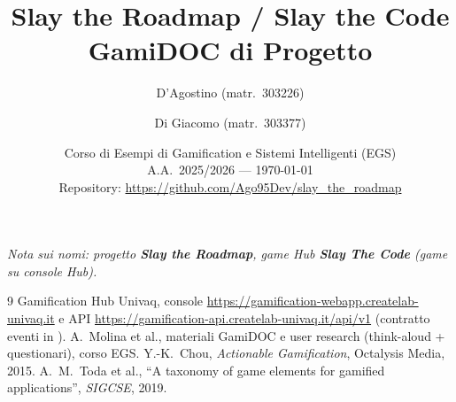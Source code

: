 \documentclass[a4paper,11pt]{report}
\title{Slay the Roadmap / Slay the Code\\GamiDOC di Progetto}
\author{D'Agostino (matr.\ 303226) \and Di Giacomo (matr.\ 303377)}
\date{Corso di Esempi di Gamification e Sistemi Intelligenti (EGS)\\A.A.\ 2025/2026 --- \today\\[1ex]
\small Repository: \url{https://github.com/Ago95Dev/slay_the_roadmap}}
\begin{document}
\maketitle
\begin{center}\small\textit{Nota sui nomi: progetto \textbf{Slay the Roadmap}, game Hub \textbf{Slay The Code} (game su console Hub).}\end{center}
\tableofcontents









\begin{thebibliography}{9}
 Gamification Hub Univaq, console \url{https://gamification-webapp.createlab-univaq.it} e API \url{https://gamification-api.createlab-univaq.it/api/v1} (contratto eventi in ).
 A.\ Molina et al., materiali GamiDOC e user research (think-aloud + questionari), corso EGS.
 Y.-K.\ Chou, \textit{Actionable Gamification}, Octalysis Media, 2015.
 A.\ M.\ Toda et al., ``A taxonomy of game elements for gamified applications'', \textit{SIGCSE}, 2019.
\end{thebibliography}
\end{document}
